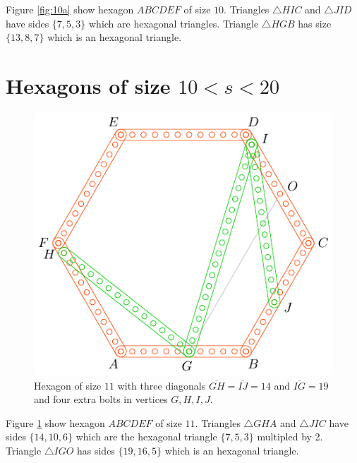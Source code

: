 \documentclass[11pt]{article}
\begin{document}
Figure \ref{fig:10a} show hexagon $ABCDEF$ of size $10$. Triangles $\triangle{HIC}$ and $\triangle{JID}$ have sides $\{7,5,3\}$ which are hexagonal triangles. Triangle $\triangle{HGB}$ has size $\{13,8,7\}$ which is an hexagonal triangle.

\section{Hexagons of size $10 < s < 20$ }

\begin{figure}[H]
\centering
\includegraphics[scale=1]{11/hexa-11a}
\caption{Hexagon of size $11$ with three diagonals $\overline{GH} = \overline{IJ} = 14$ and $\overline{IG} = 19$ and four extra bolts in vertices $G,H,I,J$.}
\label{fig:11a}
\end{figure}

Figure \ref{fig:11a} show hexagon $ABCDEF$ of size $11$. Triangles $\triangle{GHA}$ and $\triangle{JIC}$ have sides $\{14,10,6\}$ which are the hexagonal triangle $\{7,5,3\}$ multipled by 2. Triangle $\triangle{IGO}$ has sides $\{19,16,5\}$ which is an hexagonal triangle.
\end{document}
